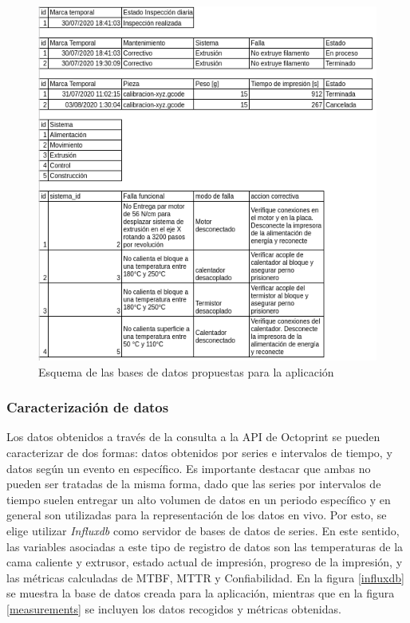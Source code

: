 \begin{figure}[H]
\centering
\includegraphics[scale=0.7]{images/esquemadb.png}
\caption{Esquema de las bases de datos propuestas para la aplicación}
\label{esquemadb}
\end{figure}

\subsubsection{Caracterización de datos}

Los datos obtenidos a través de la consulta a la API de Octoprint se pueden caracterizar de dos formas: datos obtenidos por series e intervalos de tiempo, y datos según un evento en específico. Es importante destacar que ambas no pueden ser tratadas de la misma forma, dado que las series por intervalos de tiempo suelen entregar un alto volumen de datos en un periodo específico y en general son utilizadas para la representación de los datos en vivo. Por esto, se elige utilizar \textit{Influxdb} como servidor de bases de datos de series. En este sentido, las variables asociadas a este tipo de registro de datos son las temperaturas de la cama caliente y extrusor, estado actual de impresión, progreso de la impresión, y las métricas calculadas de MTBF, MTTR y Confiabilidad. En la figura \ref{influxdb} se muestra la base de datos creada para la aplicación, mientras que en la figura \ref{measurements}  se incluyen los datos recogidos y métricas obtenidas. 

